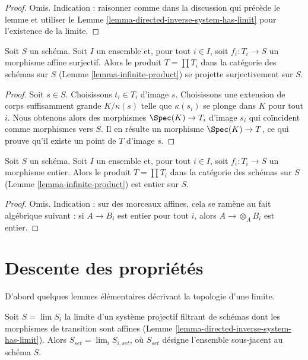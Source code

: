 \begin{proof}
Omis. Indication : raisonner comme dans la discussion qui précède le lemme
et utiliser le Lemme \ref{lemma-directed-inverse-system-has-limit} pour
l'existence de la limite.
\end{proof}

\begin{lemma}
\label{lemma-infinite-product-surjective}
Soit $S$ un schéma. Soit $I$ un ensemble et, pour tout $i \in I$, soit
$f_i : T_i \to S$ un morphisme affine surjectif. Alors le produit
$T = \prod T_i$ dans la catégorie des schémas sur $S$
(Lemme \ref{lemma-infinite-product}) se projette surjectivement sur $S$.
\end{lemma}

\begin{proof}
Soit $s \in S$. Choisissons $t_i \in T_i$ d'image $s$.
Choisissons une extension de corps suffisamment grande $K/\kappa(s)$ telle
que $\kappa(s_i)$ se plonge dans $K$ pour tout $i$. Nous obtenons alors des
morphismes $\Spec(K) \to T_i$ d'image $s_i$ qui coïncident comme morphismes
vers $S$. Il en résulte un morphisme $\Spec(K) \to T$, ce qui prouve qu'il
existe un point de $T$ d'image $s$.
\end{proof}

\begin{lemma}
\label{lemma-infinite-product-integral}
Soit $S$ un schéma. Soit $I$ un ensemble et, pour tout $i \in I$, soit
$f_i : T_i \to S$ un morphisme entier. Alors le produit $T = \prod T_i$
dans la catégorie des schémas sur $S$ (Lemme \ref{lemma-infinite-product})
est entier sur $S$.
\end{lemma}

\begin{proof}
Omis. Indication : sur des morceaux affines, cela se ramène au fait
algébrique suivant : si $A \to B_i$ est entier pour tout $i$, alors
$A \to \otimes_A B_i$ est entier.
\end{proof}





\section{Descente des propriétés}
\label{section-descent}

\noindent
D'abord quelques lemmes élémentaires décrivant la topologie d'une limite.

\begin{lemma}
\label{lemma-inverse-limit-sets}
Soit $S = \lim S_i$ la limite d'un système projectif filtrant de schémas
dont les morphismes de transition sont affines
(Lemme \ref{lemma-directed-inverse-system-has-limit}). Alors
$S_{set} = \lim_i S_{i, set}$, où $S_{set}$ désigne l'ensemble sous-jacent
au schéma $S$.
\end{lemma}

